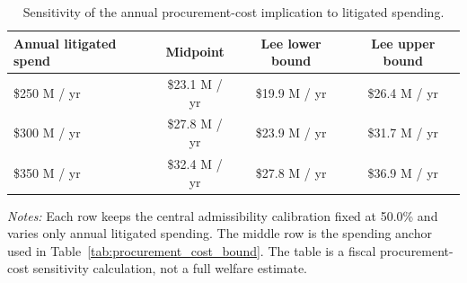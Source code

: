 \begin{table}[ht]
\centering
\caption{Sensitivity of the annual procurement-cost implication to litigated spending.}
\label{tab:procurement_cost_spending_sensitivity}
\begin{threeparttable}
\small
\begin{tabular}{lccc}
\toprule
Annual litigated spend & Midpoint & Lee lower bound & Lee upper bound \\
\midrule
\$250 M / yr & \$23.1 M / yr & \$19.9 M / yr & \$26.4 M / yr \\
\$300 M / yr & \$27.8 M / yr & \$23.9 M / yr & \$31.7 M / yr \\
\$350 M / yr & \$32.4 M / yr & \$27.8 M / yr & \$36.9 M / yr \\
\bottomrule
\end{tabular}
\begin{tablenotes}[flushleft]\footnotesize
\item \textit{Notes:} Each row keeps the central admissibility calibration fixed at 50.0\% and varies only annual litigated spending. The middle row is the spending anchor used in Table~\ref{tab:procurement_cost_bound}. The table is a fiscal procurement-cost sensitivity calculation, not a full welfare estimate.
\end{tablenotes}
\end{threeparttable}
\end{table}
